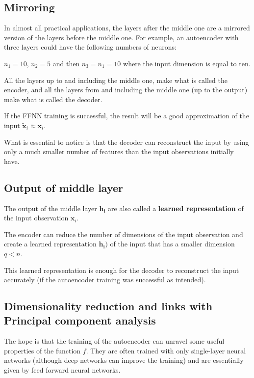 \documentclass[%
oneside,                 %
final,                   %
10pt]{article}
\begin{document}
\vspace{6mm}

\subsection{Mirroring}

In almost all practical applications,
the layers after the middle one are a mirrored version of the layers before the middle one.
For example, an autoencoder with three layers could have the following numbers of neurons:

$n_{1} = 10$, $n_{2} = 5$ and then $n_{3} = n_{1} = 10$ where the input dimension is equal to ten.

All the layers up to and including the middle one, make what is called the encoder, and all the layers from and including
the middle one (up to the output) make what is called the decoder.

If the FFNN training is successful, the result will
be a good approximation of the input $\tilde{\mathbf{x}}_{i}\approx\mathbf{x}_{i}$.

What is essential to notice is that the decoder can reconstruct the
input by using only a much smaller number of features than the input
observations initially have.

\subsection{Output of middle layer}

The output of the middle layer
$\mathbf{h}_{\mathbf{i}}$ are also called a \textbf{learned representation} of the input observation $\mathbf{x}_{i}$.

The encoder can reduce the number of dimensions of the input
observation and create a learned representation
$\mathbf{h}_{\mathbf{i}}\mathbf{) }$ of the input that has a smaller
dimension $q<n$.

This learned representation is enough for the decoder to reconstruct
the input accurately (if the autoencoder training was successful as
intended).

\subsection{Dimensionality reduction and links with Principal component analysis}

The hope is that the training of the autoencoder can unravel some
useful properties of the function $f$. They are often trained with
only single-layer neural networks (although deep networks can improve
the training) and are essentially given by feed forward neural
networks.
\end{document}
